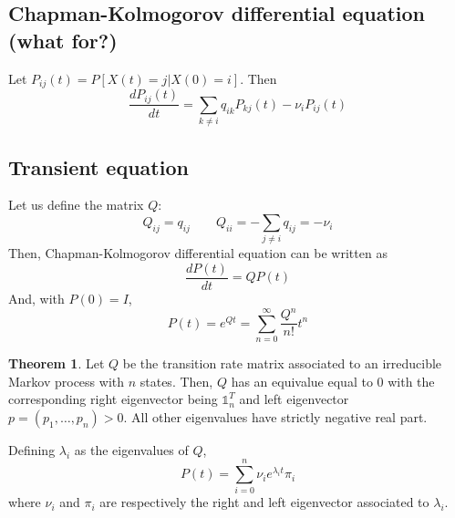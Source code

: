 \documentclass[12pt, openany]{report}
\theoremstyle{definition}
\newtheorem{thm}{Theorem}[chapter]
\begin{document}
\subsection{Chapman-Kolmogorov differential equation (what for?)} 
Let $P_{ij}(t)=P[X(t)=j|X(0)=i]$. Then 
\begin{equation}
	\frac{dP_{ij}(t)}{dt} = \sum_{k\neq i}q_{ik}P_{kj}(t)-\nu_i P_{ij}(t)
\end{equation}
\subsection{Transient equation}
Let us define the matrix $Q$:
\begin{equation}
	Q_{ij} = q_{ij}\qquad Q_{ii} = -\sum_{j\neq i}q_{ij} = -\nu_i
\end{equation}
Then, Chapman-Kolmogorov differential equation can be written as
\begin{equation}
	\frac{dP(t)}{dt} = QP(t)
\end{equation}
And, with $P(0)=I$, 
\begin{equation}
	P(t) = e^{Qt} = \sum_{n=0}^\infty \frac{Q^n}{n!}t^n
\end{equation}
\begin{thm}
	Let $Q$ be the transition rate matrix associated to an irreducible Markov process with $n$ states. Then, $Q$ has an equivalue equal to 0 with the corresponding right eigenvector being $\mathbb{1}_n^T$ and left eigenvector $p=(p_1,\dots,p_n)>0$. All other eigenvalues have strictly negative real part. 
\end{thm}
Defining $\lambda_i$ as the eigenvalues of $Q$, 
\begin{equation}
	P(t) = \sum_{i=0}^n \nu_i e^{\lambda_i t}\pi_i 
\end{equation}
where $\nu_i$ and $\pi_i$ are respectively the right and left eigenvector associated to $\lambda_i$.
\end{document}
